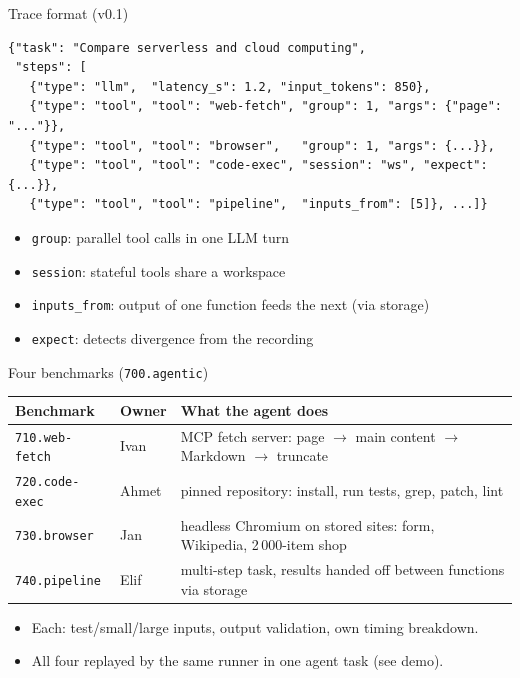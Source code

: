 \documentclass[aspectratio=169,11pt]{beamer}
\begin{document}
\begin{frame}[fragile]{Trace format (v0.1)}
\begin{verbatim}
{"task": "Compare serverless and cloud computing",
 "steps": [
   {"type": "llm",  "latency_s": 1.2, "input_tokens": 850},
   {"type": "tool", "tool": "web-fetch", "group": 1, "args": {"page": "..."}},
   {"type": "tool", "tool": "browser",   "group": 1, "args": {...}},
   {"type": "tool", "tool": "code-exec", "session": "ws", "expect": {...}},
   {"type": "tool", "tool": "pipeline",  "inputs_from": [5]}, ...]}
\end{verbatim}
  \begin{itemize}
    \item \texttt{group}: parallel tool calls in one LLM turn
    \item \texttt{session}: stateful tools share a workspace
    \item \texttt{inputs\_from}: output of one function feeds the next (via storage)
    \item \texttt{expect}: detects divergence from the recording
  \end{itemize}
\end{frame}

\begin{frame}{Four benchmarks (\texttt{700.agentic})}
  \small
  \begin{tabular}{@{}llp{7.6cm}@{}}
    \toprule
    Benchmark & Owner & What the agent does \\
    \midrule
    \texttt{710.web-fetch} & Ivan  & MCP fetch server: page $\to$ main content $\to$ Markdown $\to$ truncate \\
    \texttt{720.code-exec} & Ahmet & pinned repository: install, run tests, grep, patch, lint \\
    \texttt{730.browser}   & Jan   & headless Chromium on stored sites: form, Wikipedia, 2\,000-item shop \\
    \texttt{740.pipeline}  & Elif  & multi-step task, results handed off between functions via storage \\
    \bottomrule
  \end{tabular}
  \vspace{1em}
  \begin{itemize}
    \item Each: test/small/large inputs, output validation, own timing breakdown.
    \item All four replayed by the same runner in one agent task (see demo).
  \end{itemize}
\end{frame}
\end{document}
